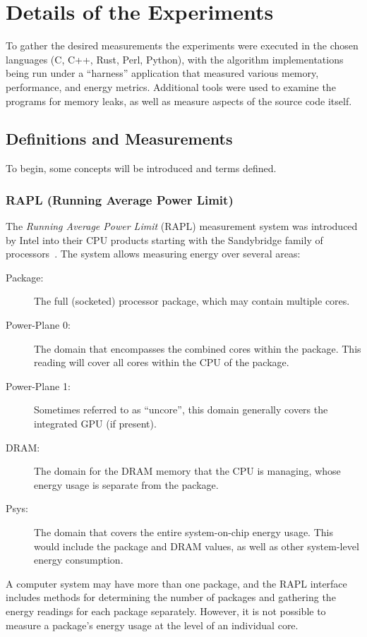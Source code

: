\section{Details of the Experiments}
\label{sec:experiments}

To gather the desired measurements the experiments were executed in the chosen languages (C, C++, Rust, Perl, Python), with the algorithm implementations being run under a ``harness'' application that measured various memory, performance, and energy metrics. Additional tools were used to examine the programs for memory leaks, as well as measure aspects of the source code itself.

\subsection{Definitions and Measurements}

To begin, some concepts will be introduced and terms defined.

\subsubsection{RAPL (Running Average Power Limit)}
\label{subsubsec:rapl}

The \textit{Running Average Power Limit} (RAPL) measurement system was introduced by Intel into their CPU products starting with the Sandybridge family of processors~\cite{khan}. The system allows measuring energy over several areas:

\begin{description}
\item[Package:] The full (socketed) processor package, which may contain multiple cores.
\item[Power-Plane 0:] The domain that encompasses the combined cores within the package. This reading will cover all cores within the CPU of the package.
\item[Power-Plane 1:] Sometimes referred to as ``uncore'', this domain generally covers the integrated GPU (if present).
\item[DRAM:] The domain for the DRAM memory that the CPU is managing, whose energy usage is separate from the package.
\item[Psys:] The domain that covers the entire system-on-chip energy usage. This would include the package and DRAM values, as well as other system-level energy consumption.
\end{description}

A computer system may have more than one package, and the RAPL interface includes methods for determining the number of packages and gathering the energy readings for each package separately. However, it is not possible to measure a package's energy usage at the level of an individual core.

